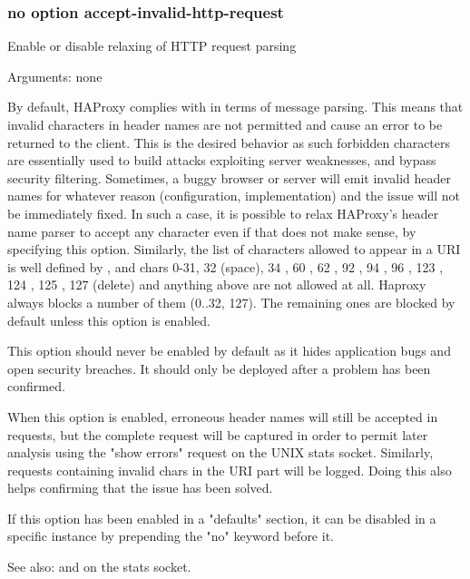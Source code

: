 \subsubsection*{no option accept-invalid-http-request}

  Enable or disable relaxing of HTTP request parsing


  Arguments: none

  By default, HAProxy complies with  in terms of message parsing. This
  means that invalid characters in header names are not permitted and cause an
  error to be returned to the client. This is the desired behavior as such
  forbidden characters are essentially used to build attacks exploiting server
  weaknesses, and bypass security filtering. Sometimes, a buggy browser or
  server will emit invalid header names for whatever reason (configuration,
  implementation) and the issue will not be immediately fixed. In such a case,
  it is possible to relax HAProxy's header name parser to accept any character
  even if that does not make sense, by specifying this option. Similarly, the
  list of characters allowed to appear in a URI is well defined by , and
  chars 0-31, 32 (space), 34 , 60 \chr{<}, 62 \chr{>}, 92 \chr{\bslash},
  94 \chr{^}, 96 , 123 \chr{\{}, 124 \chr{|}, 125 \chr{\}}, 127 (delete)
  and anything above are not allowed at all.
  Haproxy always blocks a number of them (0..32, 127). The
  remaining ones are blocked by default unless this option is enabled.

  This option should never be enabled by default as it hides application bugs
  and open security breaches. It should only be deployed after a problem has
  been confirmed.

  When this option is enabled, erroneous header names will still be accepted in
  requests, but the complete request will be captured in order to permit later
  analysis using the "show errors" request on the UNIX stats socket. Similarly,
  requests containing invalid chars in the URI part will be logged. Doing this
  also helps confirming that the issue has been solved.

  If this option has been enabled in a "defaults" section, it can be disabled
  in a specific instance by prepending the "no" keyword before it.

  See also:  and  on the
             stats socket.

